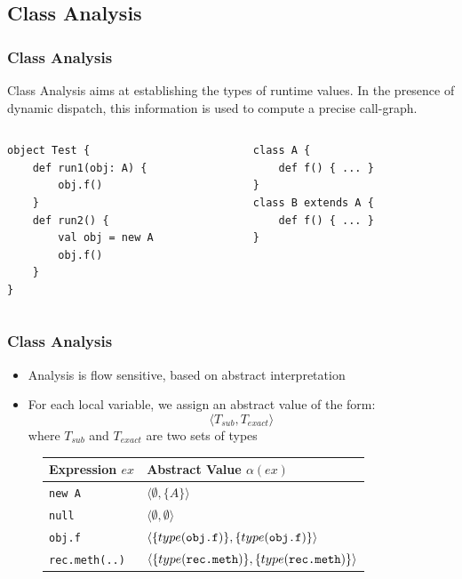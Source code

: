 \documentclass[hyperref={pdfpagelabels=false}]{beamer}
\begin{document}
\subsection{Class Analysis}
\begin{frame}[fragile]
\frametitle{Class Analysis}

    Class Analysis aims at establishing the types of runtime values. In
    the presence of dynamic dispatch, this information is used to compute a
    precise call-graph.

    \begin{columns}
      \begin{column}{0.5\textwidth}
\begin{lstlisting}
object Test {
    def run1(obj: A) {
        obj.f()
    }
    def run2() {
        val obj = new A
        obj.f()
    }
}
\end{lstlisting}
      \end{column}
      \begin{column}{0.5\textwidth}
\begin{lstlisting}
class A {
    def f() { ... }
}
class B extends A {
    def f() { ... }
}
\end{lstlisting}
      \end{column}
    \end{columns}


\end{frame}

\begin{frame}[fragile]
    \frametitle{Class Analysis}
    \begin{itemize}
        \item Analysis is flow sensitive, based on abstract interpretation
        \item For each local variable, we assign an abstract value of the form:
        $$ \langle T_{sub}, T_{exact} \rangle $$ where $T_{sub}$ and
        $T_{exact}$ are two sets of types
    \end{itemize}

\begin{figure}
    \begin{tabular}{ l | l }
        Expression $ex$       & Abstract Value $\alpha(ex)$\\
        \hline
        \verb/new A/          & $\langle \emptyset, \{ A \} \rangle$ \\
        \verb/null/           & $\langle \emptyset, \emptyset \rangle$ \\
        \verb/obj.f/          & $\langle\{type(\verb/obj.f/)\}, \{type(\verb/obj.f/)\} \rangle$ \\
        \verb/rec.meth(..)/   & $\langle\{type(\verb/rec.meth/)\}, \{type(\verb/rec.meth/)\} \rangle$ \\
    \end{tabular}
\end{figure}
\end{frame}
\end{document}
